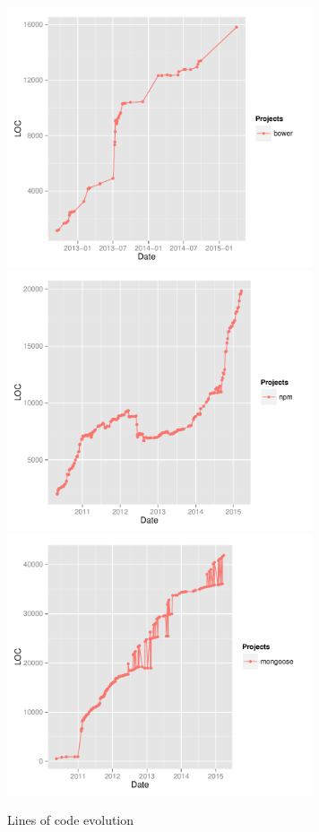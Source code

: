 \begin{figure}[thb!]
	\caption{Lines of code evolution}
	\label{fig:lines_of_code}
	\includegraphics[width=90mm,scale=0.5]{figures/bower_loc}
	\includegraphics[width=90mm,scale=0.5]{figures/npm_loc}
	\centering
	\includegraphics[width=90mm,scale=0.5]{figures/mongoose_loc}
\end{figure}

